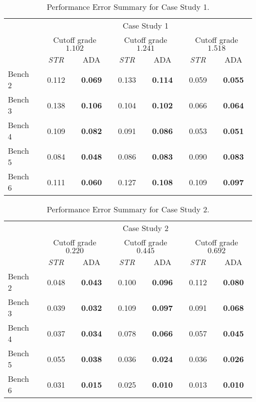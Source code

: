 \begin{table}
	\caption{Performance Error Summary for Case Study 1.}
	\label{tab:performances_global_classification_cs1_PII}
	\begin{center}
		\begin{tabular}{lcccccc}\toprule
			& \multicolumn{6}{c}{Case Study 1} \\
			& \multicolumn{2}{c}{Cutoff grade $1.102$} & \multicolumn{2}{c}{Cutoff grade $1.241$}& \multicolumn{2}{c}{Cutoff grade $1.518$}\\
			& {\emph{STR}} & {ADA} & {\emph{STR}} & {ADA} & {\emph{STR}} & {ADA}\\\midrule
			Bench 2 & 0.112  & \textbf{0.069} & 0.133   & \textbf{0.114} & 0.059  & \textbf{0.055} \\
			Bench 3 & 0.138 & \textbf{0.106} & 0.104 & \textbf{0.102} & 0.066 & \textbf{0.064}\\
			Bench 4 & 0.109 & \textbf{0.082} & 0.091 & \textbf{0.086} & 0.053 & \textbf{0.051}\\
			Bench 5 & 0.084  & \textbf{0.048}  & 0.086 & \textbf{0.083}  & 0.090  & \textbf{0.083}\\
			Bench 6 & 0.111  & \textbf{0.060}  & 0.127 & \textbf{0.108} & 0.109  & \textbf{0.097}\\
			\bottomrule
		\end{tabular}
	\end{center}
\end{table}

\begin{table}
	\caption{Performance Error Summary for Case Study 2.}
	\label{tab:performances_global_classification_cs2_PII}
	\begin{center}
		\begin{tabular}{lcccccc}\toprule
			& \multicolumn{6}{c}{Case Study 2} \\
			& \multicolumn{2}{c}{Cutoff grade $0.220$}& \multicolumn{2}{c}{Cutoff grade $0.445$} & \multicolumn{2}{c}{Cutoff grade $0.692$}\\
			& {\emph{STR}} & {ADA} & {\emph{STR}} & {ADA} & {\emph{STR}} & {ADA}\\\midrule
			Bench 2 & 0.048   & \textbf{0.043} & 0.100  & \textbf{0.096} & 0.112  & \textbf{0.080} \\
			Bench 3 & 0.039 & \textbf{0.032} & 0.109 & \textbf{0.097} & 0.091 & \textbf{0.068} \\
			Bench 4 & 0.037 & \textbf{0.034} & 0.078 & \textbf{0.066} & 0.057 & \textbf{0.045} \\
			Bench 5  & 0.055 & \textbf{0.038}  & 0.036  & \textbf{0.024} & 0.036  & \textbf{0.026} \\
			Bench 6  & 0.031 & \textbf{0.015} & 0.025  & \textbf{0.010} & 0.013  & \textbf{0.010} \\
			\bottomrule
		\end{tabular}
	\end{center}
\end{table}

